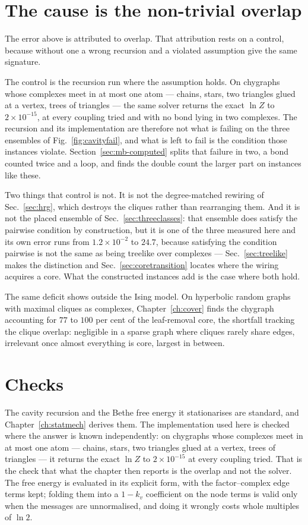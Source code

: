 \section{The cause is the non-trivial overlap}
\label{sec:deficit}

The error above is attributed to overlap. That attribution rests on a control,
because without one a wrong recursion and a violated assumption give the same
signature.

The control is the recursion run where the assumption holds. On chygraphs whose
complexes meet in at most one atom --- chains, stars, two triangles glued at a
vertex, trees of triangles --- the same solver returns the exact $\ln Z$ to
$2\times10^{-15}$, at every coupling tried and with no bond lying in two
complexes. The recursion and its implementation are therefore not what is
failing on the three ensembles of Fig.~\ref{fig:cavityfail}, and what is left to
fail is the condition those instances violate. Section~\ref{sec:mb-computed}
splits that failure in two, a bond counted twice and a loop, and finds the
double count the larger part on instances like these.

Two things that control is not. It is not the degree-matched rewiring of
Sec.~\ref{sec:hrg}, which destroys the cliques rather than rearranging them.
And it is not the placed ensemble of Sec.~\ref{sec:threeclasses}: that ensemble
does satisfy the pairwise condition by construction, but it is one of the three
measured here and its own error runs from $1.2\times10^{-2}$ to $24.7$, because
satisfying the condition pairwise is not the same as being treelike over
complexes --- Sec.~\ref{sec:treelike} makes the distinction and
Sec.~\ref{sec:coretransition} locates where the wiring acquires a core. What the
constructed instances add is the case where both hold.

The same deficit shows outside the Ising model. On hyperbolic random graphs with
maximal cliques as complexes, Chapter~\ref{ch:cover} finds the chygraph
accounting for $77$ to $100$ per cent of the leaf-removal core, the shortfall
tracking the clique overlap: negligible in a sparse graph where cliques rarely
share edges, irrelevant once almost everything is core, largest in between.

\section{Checks}
\label{sec:cavity-checks}

The cavity recursion and the Bethe free energy it stationarises are standard, and
Chapter~\ref{ch:statmech} derives them. The implementation used here is checked
where the answer is known independently: on chygraphs whose complexes meet in at
most one atom --- chains, stars, two triangles glued at a vertex, trees of
triangles --- it returns the exact $\ln Z$ to $2\times10^{-15}$ at every
coupling tried. That is the check that what the chapter then reports is the
overlap and not the solver. The free energy is evaluated in its explicit form,
with the factor--complex edge terms kept; folding them into a $1-k_{v}$
coefficient on the node terms is valid only when the messages are unnormalised,
and doing it wrongly costs whole multiples of $\ln 2$.

